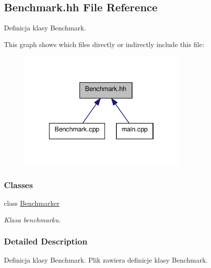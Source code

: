 \hypertarget{a00006}{\subsection{Benchmark.\-hh File Reference}
\label{a00006}
}


Definicja klasy Benchmark.  


This graph shows which files directly or indirectly include this file\-:\nopagebreak
\begin{figure}[H]
\begin{center}
\leavevmode
\includegraphics[width=238pt]{a00017}
\end{center}
\end{figure}
\subsubsection*{Classes}
\begin{DoxyCompactItemize}
\item 
class \hyperlink{a00001}{Benchmarker}
\begin{DoxyCompactList}\small\item\em Klasa benchmarku. \end{DoxyCompactList}\end{DoxyCompactItemize}


\subsubsection{Detailed Description}
Definicja klasy Benchmark. Plik zawiera definicje klasy Benchmark. 